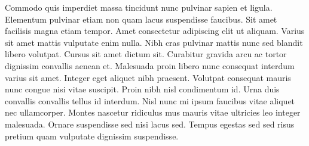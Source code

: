 Commodo quis imperdiet massa tincidunt nunc pulvinar sapien et ligula. Elementum pulvinar etiam non quam lacus suspendisse faucibus. Sit amet facilisis magna etiam tempor. Amet consectetur adipiscing elit ut aliquam. Varius sit amet mattis vulputate enim nulla. Nibh cras pulvinar mattis nunc sed blandit libero volutpat. Cursus sit amet dictum sit. Curabitur gravida arcu ac tortor dignissim convallis aenean et. Malesuada proin libero nunc consequat interdum varius sit amet. Integer eget aliquet nibh praesent. Volutpat consequat mauris nunc congue nisi vitae suscipit. Proin nibh nisl condimentum id. Urna duis convallis convallis tellus id interdum. Nisl nunc mi ipsum faucibus vitae aliquet nec ullamcorper. Montes nascetur ridiculus mus mauris vitae ultricies leo integer malesuada. Ornare suspendisse sed nisi lacus sed. Tempus egestas sed sed risus pretium quam vulputate dignissim suspendisse.
